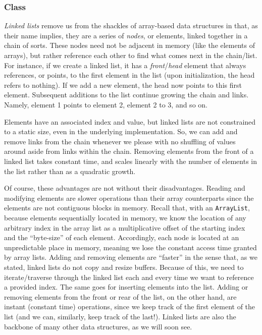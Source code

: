 \subsubsection*{ Class}
\emph{Linked lists} remove us from the shackles of array-based data structures in that, as their name implies, they are a series of \emph{nodes}, or elements, linked together in a chain of sorts. 
These nodes need not be adjacent in memory (like the elements of arrays), but rather reference each other to find what comes next in the chain/list. 
For instance, if we create a linked list, it has a \emph{front}/\emph{head} element that always references, or points, to the first element in the list (upon initialization, the head refers to nothing). 
If we add a new element, the head now points to this first element. 
Subsequent additions to the list continue growing the chain and links. 
Namely, element 1 points to element 2, element 2 to 3, and so on. 

Elements have an associated index and value, but linked lists are not constrained to a static size, even in the underlying implementation. 
So, we can add and remove links from the chain whenever we please with no shuffling of values around aside from links within the chain. 
Removing elements from the front of a linked list takes constant time, and scales linearly with the number of elements in the list rather than as a quadratic growth.

Of course, these advantages are not without their disadvantages. 
Reading and modifying elements are slower operations than their array counterparts since the elements are not contiguous blocks in memory. 
Recall that, with an \texttt{ArrayList}, because elements sequentially located in memory, we know the location of any arbitrary index in the array list as a multiplicative offset of the starting index and the ``byte-size'' of each element. 
Accordingly, each node is located at an unpredictable place in memory, meaning we lose the constant access time granted by array lists.
Adding and removing elements are ``faster'' in the sense that, as we stated, linked lists do not copy and resize buffers. 
Because of this, we need to iterate/traverse through the linked list each and every time we want to reference a provided index. 
The same goes for inserting elements into the list. 
Adding or removing elements from the front or rear of the list, on the other hand, are instant (constant time) operations, since we keep track of the first element of the list (and we can, similarly, keep track of the last!). 
Linked lists are also the backbone of many other data structures, as we will soon see.

